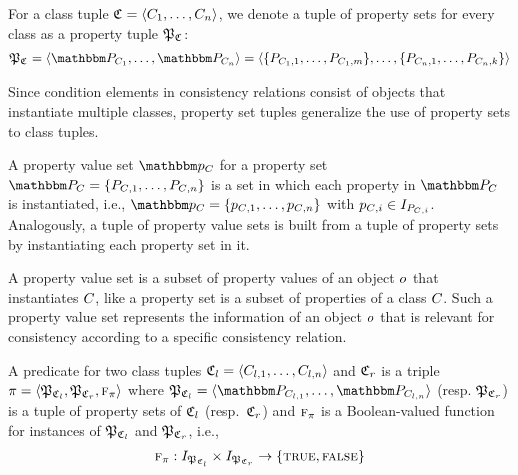 \begin{definition}
For a class tuple $\classtuple{C}{} = \tupled{\class{C}{1}, \dots, \class{C}{n}}$, we denote a tuple of property sets for every class as a property tuple $\propertysettuple{P}{\classtuple{C}{}}$:
\begin{align*}
    \propertysettuple{P}{\classtuple{C}{}} = \tupled{\propertyset{P}{\class{C}{1}}, \dots, \propertyset{P}{\class{C}{n}}} = \tupled{\setted{P_{\class{C}{1}, 1}, \dots, P_{\class{C}{1}, m}}, \dots, \setted{P_{\class{C}{n}, 1}, \dots, P_{\class{C}{n}, k}}}
\end{align*}
\end{definition}

Since condition elements in consistency relations consist of objects that instantiate multiple classes, property set tuples generalize the use of property sets to class tuples.

\begin{definition}
A property value set $\propertyvalueset{p}{\class{C}{}}$ for a property set $\propertyset{P}{\class{C}{}} = \setted{P_{\class{C}{}, 1}, \dots, P_{\class{C}{}, n}}$ is a set in which each property in $\propertyset{P}{\class{C}{}}$ is instantiated, i.e., $\propertyvalueset{p}{\class{C}{}} = \setted{p_{\class{C}{}, 1}, \dots, p_{\class{C}{}, n}}$ with $p_{\class{C}{}, i} \in I_{P_{\class{C}{}, i}}$. 
Analogously, a tuple of property value sets is built from a tuple of property sets by instantiating each property set in it.
\end{definition}

A property value set is a subset of property values of an object $\object{o}{}$ that instantiates $\class{C}{}$, like a property set is a subset of properties of a class $\class{C}{}$. Such a property value set represents the information of an object $\object{o}{}$ that is relevant for consistency according to a specific consistency relation.

\begin{definition}[Predicate]
A predicate for two class tuples $\classtuple{C}{l} = \tupled{\class{C}{l,1}, \dots, \class{C}{l,n}}$ and $\classtuple{C}{r}$ is a triple $\pi = \tupled{\propertysettuple{P}{\classtuple{C}{l}}, \propertysettuple{P}{\classtuple{C}{r}}, \function{f}_\pi}$ where $\propertysettuple{P}{\classtuple{C}{l}} = \tupled{\propertyset{P}{\class{C}{l,1}}, \dots, \propertyset{P}{\class{C}{l,n}}}$ (resp. $\propertysettuple{P}{\classtuple{C}{r}}$) is a tuple of property sets of $\classtuple{C}{l}$ (resp.\ $\classtuple{C}{r}$) and $\textsc{f}_\pi$ is a Boolean-valued function for instances of $\tuple{P}_{\classtuple{C}{l}}$ and $\tuple{P}_{\classtuple{C}{r}}$, i.e.,
\begin{align*}
    \function{f}_\pi : \instances{\propertysettuple{P}{\classtuple{C}{l}}} \times \instances{\propertysettuple{P}{\classtuple{C}{r}}} \to \setted{\truemath, \falsemath}
\end{align*}
\end{definition}

